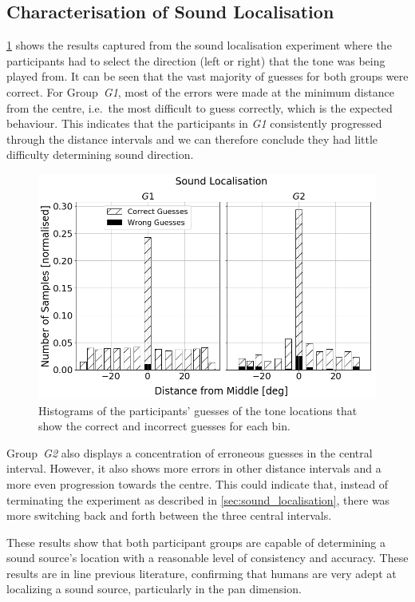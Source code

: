 \documentclass[acmsmall]{acmart}
\begin{document}
\subsection{Characterisation of Sound Localisation}

\cref{fig:sound-localisation} shows the results captured from the sound localisation experiment where the participants had to select the direction (left or right) that the tone was being played from. 
It can be seen that the vast majority of guesses for both groups were correct.
For Group~\textit{G1}, most of the errors were made at the minimum distance from the centre, i.e.\ the most difficult to guess correctly, which is the expected behaviour.
This indicates that the participants in \textit{G1} consistently progressed through the distance intervals and we can therefore conclude they had little difficulty determining sound direction.

\begin{figure}
  \centering
  \includegraphics[width=0.8\columnwidth]{figures/sound_localisation.png}
  \caption{Histograms of the participants' guesses of the tone locations that show the correct and incorrect guesses for each bin. }\label{fig:sound-localisation}
\end{figure}

Group~\textit{G2} also displays a concentration of erroneous guesses in the central interval.
However, it also shows more errors in other distance intervals and a more even progression towards the centre.
This could indicate that, instead of terminating the experiment as described in \cref{sec:sound_localisation}, there was more switching back and forth between the three central intervals. 

These results show that both participant groups are capable of determining a sound source's location with a reasonable level of consistency and accuracy.
These results are in line previous literature, confirming that humans are very adept at localizing a sound source, particularly in the pan dimension. 
\end{document}
